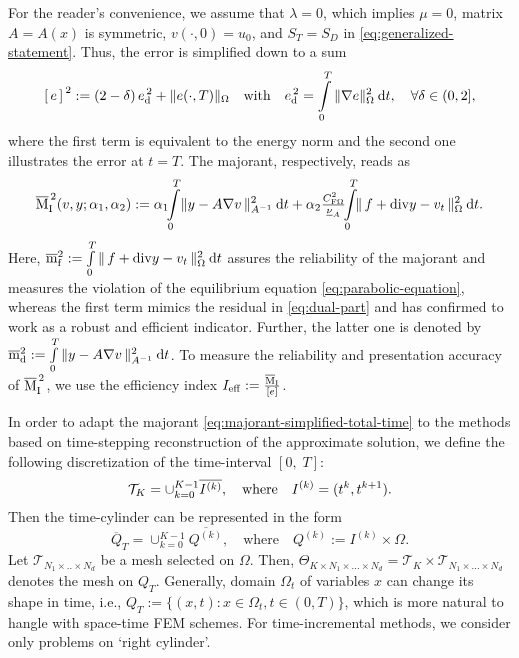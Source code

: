 For the reader's convenience, we assume that $\lambda = 0$, which implies
$\mu = 0$, matrix $A = A(x)$ is symmetric, $v(\cdot, 0) = u_0$, and $S_T = S_D$ in \eqref{eq:generalized-statement}.
Thus, the error is simplified down to a sum 
%
\begin{equation*}
\error := (2 - \delta)\, \ed + \| e(\cdot, T)\|_{\Omega} \quad \mbox{with} \quad
\ed = \Int_0^T \| \nabla e\|^2_{\Omega} \dt, \quad \forall \delta \in (0, 2],
\end{equation*}
%
where the first term is equivalent to the energy norm and the second one 
illustrates the error at $t = T$. The majorant, respectively, reads as
%
\begin{equation}
\majone (v, y; \alpha_1, \alpha_2) 
	:= \alpha_1 \! \! \Int_0^T \! \| y - A \nabla v \,\|^2_{A^{-1}} \dt + 
		\alpha_2 \tfrac{\CFriedrichs^2}{\underline{\nu}_A}
		\!\! \Int_0^T  \!\! \| \, f + \dvrg y - v_t  \, \|^2_{\Omega} \dt.
		\label{eq:majorant-simplified-total-time}
\end{equation}
%
Here, $\overline{\mathrm m}^2_{\mathrm{f}} := \int\limits_0^T \| \, f + \mathrm{div} y - v_t  \, \|^2_{\Omega}\mathrm{\:d}t$ 
assures the reliability of the majorant and measures the violation of the equilibrium 
equation \eqref{eq:parabolic-equation}, whereas the first term mimics the residual 
in \eqref{eq:dual-part} and has confirmed to work as a robust and efficient indicator.
Further, the latter one is denoted by
$\overline{\mathrm m}^2_{\mathrm{d}} := \int\limits_0^T \| y - A \nabla v \,\|^2_{A^{-1}} \mathrm{\:d}t$.
%
To measure the reliability and presentation accuracy of $\overline{\mathrm M}^{\,2}_{\mathrm{I}}$, 
we use the efficiency index $I_{\rm eff} := \tfrac{\overline{\mathrm M}_{\mathrm{I}}}{[e]}$.

In order to adapt the majorant \eqref{eq:majorant-simplified-total-time} to the methods based on
time-stepping reconstruction of the approximate solution, we define the following
discretization of the time-interval $[0,\; T]$: 
%
\begin{equation}
\mathcal{T}_K = \cup_{k = 0}^{K-1} \overline{{I}^{(k)}}, \quad {\rm where} \quad 
{I}^{(k)} = (t^k, t^{k + 1}).
\end{equation}
%
Then the time-cylinder can be 
represented in the form 
%
\begin{equation}
\overline{Q}_T = \cup_{k = 0}^{K-1} \overline{Q^{(k)}}, \quad \mbox{where} \quad
Q^{(k)} := {I}^{(k)} \times \Omega.
\end{equation}
%
Let $\mathcal{T}_{N_1 \times .. \times N_d}$ be a mesh selected on $\Omega$. Then,  
$\Theta_{K \times N_1 \times ... \times N_d} = 
\mathcal{T}_K \times \mathcal{T}_{N_1 \times ... \times N_d}$
denotes the mesh on $Q_T$. 
%
Generally, domain $\Omega_t$ of variables $x$ can change its shape in time, 
i.e., 
$Q_T := \{ (x, t) : x \in \Omega_t, t \in (0, T)\}$, which is more natural to hangle 
with space-time FEM schemes. For time-incremental methods, we consider 
only problems on `right cylinder'.

